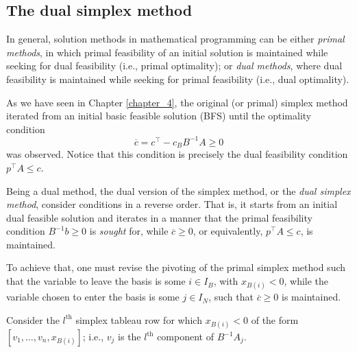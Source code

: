 
\subsection{The dual simplex method}

In general, solution methods in mathematical programming can be either \emph{primal methods}, in which primal feasibility of an initial solution is maintained while seeking for dual feasibility (i.e., primal optimality); or \emph{dual methods}, where dual feasibility is maintained while seeking for primal feasibility (i.e., dual optimality).

As we have seen in Chapter \ref{chapter_4}, the original (or primal) simplex method iterated from an initial basic feasible solution (BFS) until the optimality condition 
%
\begin{equation*}
	\overline{c} = c^\top - c_BB^{-1}A \geq 0
\end{equation*}
%
was observed. Notice that this condition is precisely the dual feasibility condition $p^\top A \leq c$. 

Being a dual method, the dual version of the simplex method, or the \emph{dual simplex method}, consider conditions in a reverse order. That is, it starts from an initial dual feasible solution and iterates in a manner that the primal feasibility condition $B^{-1}b \geq 0$ is \emph{sought} for, while $\overline{c} \geq 0$, or equivalently, $p^\top A \leq c$, is maintained.

To achieve that, one must revise the pivoting of the primal simplex method such that the variable to leave the basis is some $i \in I_B$, with $x_{B(i)} < 0$, while the variable chosen to enter the basis is some $j \in I_N$, such that $\overline{c} \geq 0$ is maintained.

 Consider the $l^\text{th}$ simplex tableau row for which $x_{B(i)} < 0$ of the form $[v_1,\dots, v_n, x_{B(i)}]$; i.e., $v_j$ is the $l^\text{th}$ component of $B^{-1}A_j$.
	 
